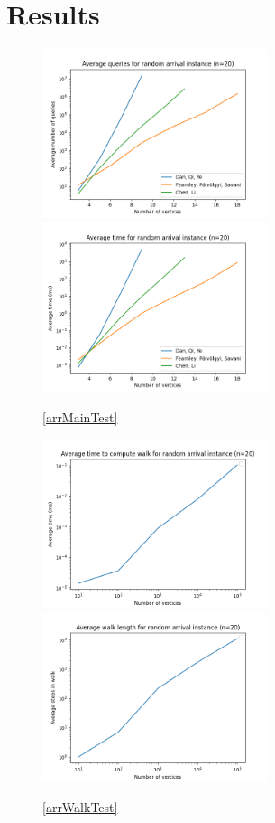 \section{Results} \label{resultsSec}
  \vspace{-15pt}
  \begin{figure}[H]
      \centering
      \includegraphics[width=2.6in]{plots/arrival_queries.png}
      \centering
      \includegraphics[width=2.6in]{plots/arrival_time.png}
      \caption{\cref{arrMainTest}} \label{arrivalMainPlot}
  \end{figure}
  \vspace{-22pt}
  \begin{figure}[H]
      \centering
      \includegraphics[width=2.6in]{plots/arrival_steps.png}
      \centering
      \includegraphics[width=2.6in]{plots/arrival_wtime.png}
      \caption{\cref{arrWalkTest}} \label{arrivalWalkPlot}
  \end{figure}
